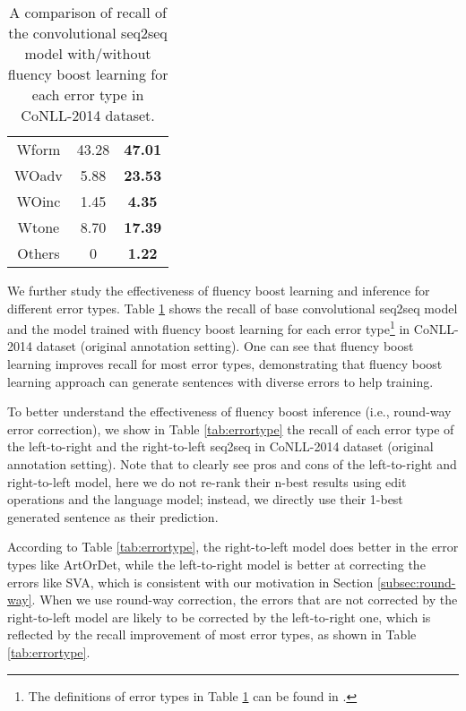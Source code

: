 \documentclass{article} \usepackage{MSRA_TR,times}
\begin{document}
\begin{table}[t]
\begin{tabular}{c|c|c}
Wform      & 43.28                      & \bf 47.01              \\
WOadv      & 5.88                       & \bf 23.53              \\
WOinc      & 1.45                       & \bf 4.35               \\
Wtone      & 8.70                       & \bf 17.39              \\
Others     & 0                          & \bf 1.22              \\ \hline
\end{tabular}
\caption{A comparison of recall of the convolutional seq2seq model with/without fluency boost learning for each error type in CoNLL-2014 dataset.}
\label{tab:boost_errortype}
\end{table}

We further study the effectiveness of fluency boost learning and inference for different error types. Table \ref{tab:boost_errortype} shows the recall of base convolutional seq2seq model and the model trained with fluency boost learning for each error type\footnote{The definitions of error types in Table \ref{tab:boost_errortype} can be found in \cite{ng2014conll}.} in CoNLL-2014 dataset (original annotation setting). One can see that fluency boost learning improves recall for most error types, demonstrating that fluency boost learning approach can generate sentences with diverse errors to help training.

To better understand the effectiveness of fluency boost inference (i.e., round-way error correction), we show in Table \ref{tab:errortype} the recall of each error type of the left-to-right and the right-to-left seq2seq in CoNLL-2014 dataset (original annotation setting). Note that to clearly see pros and cons of the left-to-right and right-to-left model, here we do not re-rank their n-best results using edit operations and the language model; instead, we directly use their 1-best generated sentence as their prediction.

According to Table \ref{tab:errortype}, the right-to-left model does better in the error types like ArtOrDet, while the left-to-right model is better at correcting the errors like SVA, which is consistent with our motivation in Section \ref{subsec:round-way}. When we use round-way correction, the errors that are not corrected by the right-to-left model are likely to be corrected by the left-to-right one, which is reflected by the recall improvement of most error types, as shown in Table \ref{tab:errortype}.
\end{document}
